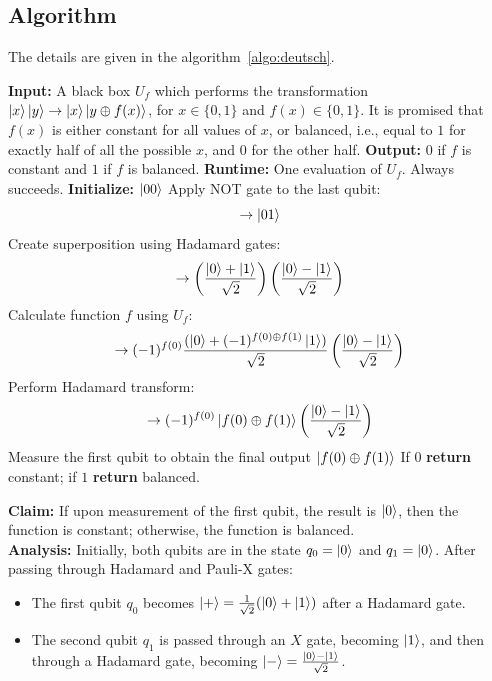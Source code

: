 \subsection{Algorithm}
The details are given in the algorithm~\ref{algo:deutsch}.
\begin{algorithm}
    \caption{Deutsch Algorithm}
    \begin{algorithmic}[1]
    \State \textbf{Input:} A black box $U_f$ which performs the transformation $\ket{x}\ket{y} \rightarrow \ket{x}\ket{y \oplus f(x)}$, for $x \in \{0,1\}$ and $f(x) \in \{0,1\}$. It is promised that $f(x)$ is either constant for all values of $x$, or balanced, i.e., equal to $1$ for exactly half of all the possible $x$, and $0$ for the other half.
    \State \textbf{Output:} $0$ if $f$ is constant and $1$ if $f$ is balanced.
    \State \textbf{Runtime:} One evaluation of $U_f$. Always succeeds.
    \State \textbf{Initialize:} $\ket{00}$
    \State Apply NOT gate to the last qubit:
    \[
    \rightarrow \ket{01}
    \]
    \State Create superposition using Hadamard gates:
    \[
    \rightarrow \left(\frac{\ket{0}+\ket{1}}{\sqrt{2}}\right) \left(\frac{\ket{0} - \ket{1}}{\sqrt{2}}\right)
    \]
    \State Calculate function $f$ using $U_f$:
    \[
    \rightarrow  (-1)^{f(0)}\frac{(\ket{0}+(-1)^{f(0)\oplus f(1)}\ket{1})}{\sqrt{2}} \left(\frac{\ket{0} - \ket{1}}{\sqrt{2}}\right)
    \]
    \State Perform Hadamard transform:
    \[
    \rightarrow (-1)^{f(0)} \ket{f(0)\oplus f(1)} \left(\frac{\ket{0} - \ket{1}}{\sqrt{2}}\right)
    \]
    \State Measure the first qubit to obtain the final output $\ket{f(0)\oplus f(1)}$
    \State If $0$ \textbf{return} constant; if $1$ \textbf{return} balanced.
    \end{algorithmic}
    \label{algo:deutsch}
\end{algorithm}
\textbf{Claim: }If upon measurement of the first qubit, the result is $\ket{0}$, then the function is constant; otherwise, the function is balanced.\\
\textbf{Analysis: }Initially, both qubits are in the state $q_0 = \ket{0}$ and $q_1 = \ket{0}$. After passing through Hadamard and Pauli-X gates:

\begin{itemize}
    \item The first qubit $q_0$ becomes $\ket{+} = \frac{1}{\sqrt{2}}(\ket{0} + \ket{1})$ after a Hadamard gate.
    \item The second qubit $q_1$ is passed through an $X$ gate, becoming $\ket{1}$, and then through a Hadamard gate, becoming $\ket{-} = \frac{\ket{0} - \ket{1}}{\sqrt{2}}$.
\end{itemize}

